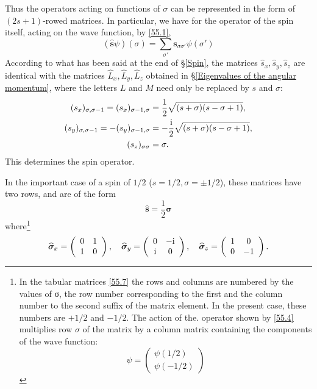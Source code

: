 Thus the operators acting on functions of $\sigma$ can be represented in the form of $ (2s + 1) $-rowed matrices. In particular, we have for the operator of the spin itself, acting on the wave function, by \eqref{55.1},
\begin{equation}\label{55.4}
\left(\hat{\bm{s}}\psi \right)(\sigma)=\sum_{\sigma'}\bm{s}_{\sigma\sigma'}\psi(\sigma')
\end{equation}
According to what has been said at the end of \S\ref{Spin}, the matrices $ \hat{s}_x, \hat{s}_y, \hat{s}_z $ are identical with the matrices $ \hat{L}_x, \hat{L}_y, \hat{L}_z $ obtained in \S\ref{Eigenvalues of the angular momentum}, where the letters $ L $ and $ M $ need only be replaced by $ s $ and $\sigma$:
\begin{equation}\label{55.5}
\begin{split}
(s_x)_{\sigma,\sigma-1}=(s_x)_{\sigma-1,\sigma}&=\frac{1}{2}\sqrt{(s+\sigma)(s-\sigma+1)},\\
(s_y)_{\sigma,\sigma-1}=-(s_y)_{\sigma-1,\sigma}&=-\frac{\mathrm{i}}{2}\sqrt{(s+\sigma)(s-\sigma+1)},\\
(s_z)_{\sigma\sigma}&=\sigma.
\end{split}
\end{equation}
This determines the spin operator.

In the important case of a spin of $ 1/2 $ ($ s = 1/2, σ = \pm1/2 $), these matrices have two rows, and are of the form
\begin{equation}\label{55.6}
\hat{\bm{s}}=\frac{1}{2}\hat{\bm{\sigma}}
\end{equation}
where\footnote{In the tabular matrices \eqref{55.7} the rows and columns are numbered by the values of σ, the row number corresponding to the first and the column number to the second suffix of the matrix element. In the present case, these numbers are $ +1/2 $ and $ -1/2 $. The action of the. operator shown by \eqref{55.4} multiplies row $\sigma$ of the matrix by a column matrix containing the components of the wave function:
	\[ \psi=\left(\begin{array}{c}
	\psi(1/2)\\
	\psi(-1/2)
	\end{array}\right) \]
}
\begin{equation}\label{55.7}
\widehat{\bm{\sigma}}_x=\left(\begin{array}{cc}
0&1\\
1&0
\end{array} \right),\quad\widehat{\bm{\sigma}}_y=\left( \begin{array}{cc}
0&-\mathrm{i}\\\mathrm{i}&0
\end{array}\right),\quad
\widehat{\bm{\sigma}}_z=\left(\begin{array}{cc}
1&0\\
0&-1
\end{array} \right).
\end{equation}


